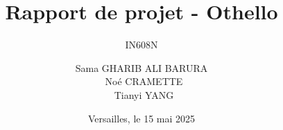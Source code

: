 \documentclass[aspectratio=169]{beamer}
\title{Rapport de projet - Othello}
\subtitle{IN608N}
\author{Sama GHARIB ALI BARURA \\
\ Noé CRAMETTE \\
\ Tianyi YANG}
\institute
{
    Université de Versailles Saint-Quentin \\
    Licence d'informatique
}
\date{Versailles, le 15 mai 2025}
\begin{document}
	\begin{frame}
		\titlepage
	\end{frame}

	
	
	
\end{document}
